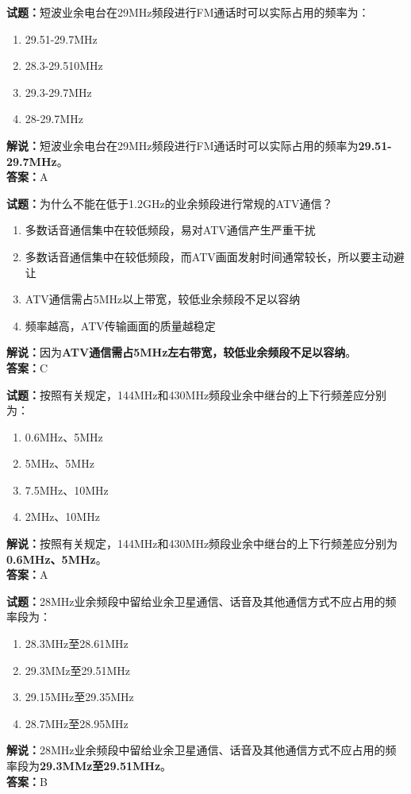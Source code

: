 \documentclass{ctexbook}
\begin{document}
\bigskip


\noindent\textbf{试题：}短波业余电台在29MHz频段进行FM通话时可以实际占用的频率为：
\begin{enumerate}[leftmargin=3em]
\item 29.51-29.7MHz
\item 28.3-29.510MHz%
\item 29.3-29.7MHz
\item 28-29.7MHz
\end{enumerate}
\noindent\textbf{解说：}短波业余电台在29MHz频段进行FM通话时可以实际占用的频率为\textbf{29.51-29.7MHz}。\\\noindent\textbf{答案：}A



\bigskip


\noindent\textbf{试题：}为什么不能在低于1.2GHz的业余频段进行常规的ATV通信？
\begin{enumerate}[leftmargin=3em]
\item 多数话音通信集中在较低频段，易对ATV通信产生严重干扰
\item 多数话音通信集中在较低频段，而ATV画面发射时间通常较长，所以要主动避让
\item ATV通信需占5MHz以上带宽，较低业余频段不足以容纳
\item 频率越高，ATV传输画面的质量越稳定
\end{enumerate}
\noindent\textbf{解说：}因为\textbf{ATV通信需占5MHz左右带宽，较低业余频段不足以容纳}。\\\noindent\textbf{答案：}C




\bigskip


\noindent\textbf{试题：}按照有关规定，144MHz和430MHz频段业余中继台的上下行频差应分别为：
\begin{enumerate}[leftmargin=3em]
\item 0.6MHz、5MHz%
\item 5MHz、5MHz
\item 7.5MHz、10MHz
\item 2MHz、10MHz
\end{enumerate}
\noindent\textbf{解说：}按照有关规定，144MHz和430MHz频段业余中继台的上下行频差应分别为\textbf{0.6MHz、5MHz}。\\\noindent\textbf{答案：}A



\bigskip


\noindent\textbf{试题：}28MHz业余频段中留给业余卫星通信、话音及其他通信方式不应占用的频率段为：
\begin{enumerate}[leftmargin=3em]
\item 28.3MHz至28.61MHz
\item 29.3MMz至29.51MHz
\item 29.15MHz至29.35MHz
\item 28.7MHz至28.95MHz
\end{enumerate}
\noindent\textbf{解说：}28MHz业余频段中留给业余卫星通信、话音及其他通信方式不应占用的频率段为\textbf{29.3MMz至29.51MHz}。\\\noindent\textbf{答案：}B
\end{document}
